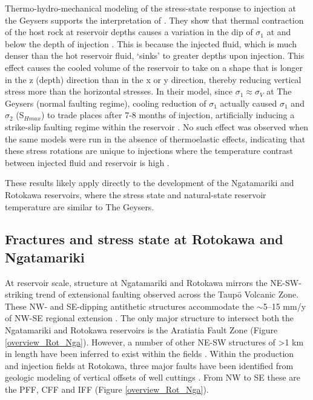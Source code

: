 Thermo-hydro-mechanical modeling of the stress-state response to injection at the Geysers \citep{Jeanne_2014,Jeanne_2015tensor} supports the interpretation of \citet{Mart_nez_Garz_n_2013}. They show that thermal contraction of the host rock at reservoir depths causes a variation in the dip of $\sigma_{1}$ at and below the depth of injection \citep{Jeanne_2015tensor}. This is because the injected fluid, which is much denser than the hot reservoir fluid, `sinks' to greater depths upon injection. This effect causes the cooled volume of the reservoir to take on a shape that is longer in the z (depth) direction than in the x or y direction, thereby reducing vertical stress more than the horizontal stresses. In their model, since $\sigma_{1}\approx{\sigma_{V}}$ at The Geysers (normal faulting regime), cooling reduction of $\sigma_{1}$ actually caused $\sigma_{1}$ and $\sigma_{2}$ (S$_{Hmax}$) to trade places after 7-8 months of injection, artificially inducing a strike-slip faulting regime within the reservoir \citep{Jeanne_2015tensor}. No such effect was observed when the same models were run in the absence of thermoelastic effects, indicating that these stress rotations are unique to injections where the temperature contrast between injected fluid and reservoir is high \citep{Jeanne_2015tensor}. 

These results likely apply directly to the development of the Ngatamariki and Rotokawa reservoirs, where the stress state and natural-state reservoir temperature are similar to The Geysers. 

\subsection{Fractures and stress state at Rotokawa and Ngatamariki}
At reservoir scale, structure at Ngatamariki and Rotokawa mirrors the NE-SW-striking trend of extensional faulting observed across the Taup\={o} Volcanic Zone. These NW- and SE-dipping antithetic structures accommodate the $\sim$5--15 mm/y of NW-SE regional extension \citep{Rowland_2004,Wallace_2004}. The only major structure to intersect both the Ngatamariki and Rotokawa reservoirs is the Aratiatia Fault Zone (Figure \ref{overview_Rot_Nga}). However, a number of other NE-SW structures of \textgreater{1} km in length have been inferred to exist within the fields \citep{wallis2013,Chambefort_2014}. Within the production and injection fields at Rotokawa, three major faults have been identified from geologic modeling of vertical offsets of well cuttings \citep{wallis2013}. From NW to SE these are the \acrfull{PFF}, \acrfull{CFF} and \acrfull{IFF} (Figure \ref{overview_Rot_Nga}).

